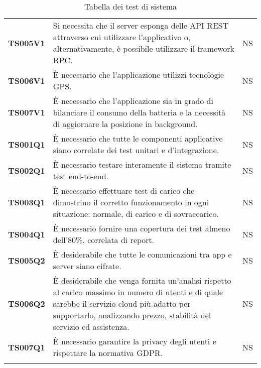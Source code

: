 \documentclass[../piano-di-qualifica.tex]{subfiles}
\begin{document}
\begin{centering}
\begin{longtable}[H]{>{\centering\bfseries}m{3cm} >{}p{10cm} >{\centering\arraybackslash}m{3cm}}
        TS005V1 & Si necessita che il server esponga delle API REST attraverso cui utilizzare l’applicativo o, alternativamente, è possibile utilizzare il framework RPC\@. \newline
                & NS \\

        TS006V1 & È necessario che l’applicazione utilizzi tecnologie GPS\@. \newline
                & NS \\

        TS007V1 & È necessario che l’applicazione sia in grado di bilanciare il consumo della batteria e la necessità di aggiornare la posizione in background. \newline
                & NS \\

        TS001Q1 & È necessario che tutte le componenti applicative siano correlate dei test unitari e d’integrazione. \newline
                & NS \\

        TS002Q1 & È necessario testare interamente il sistema tramite test end-to-end. \newline
                & NS \\

        TS003Q1 & È necessario effettuare test di carico che dimostrino il corretto funzionamento in ogni situazione: normale, di carico e di sovraccarico. \newline
                & NS \\

        TS004Q1 & È necessario fornire una copertura dei test almeno dell’80\%, correlata di report. \newline
                & NS \\

        TS005Q2 & È desiderabile che tutte le comunicazioni tra app e server siano cifrate. \newline
                & NS \\

        TS006Q2 & È desiderabile che venga fornita un’analisi rispetto al carico massimo in numero di utenti e di quale sarebbe il servizio cloud più adatto per supportarlo, analizzando prezzo, stabilità del servizio ed assistenza. \newline
                & NS \\

        TS007Q1 & È necessario garantire la privacy degli utenti e rispettare la normativa GDPR\@. \newline
                & NS \\

        \caption{Tabella dei test di sistema}%
        \label{tab:test_sistema}
      \end{longtable}
    \end{centering}
\end{document}
